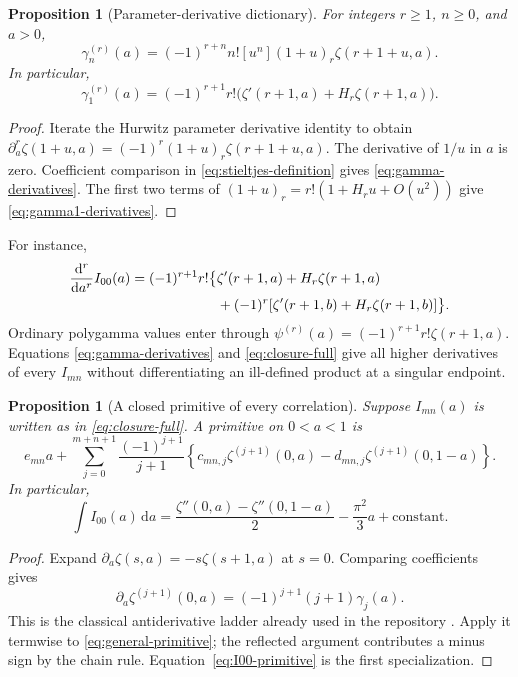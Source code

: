 \documentclass[11pt]{article}
\numberwithin{equation}{section}
\newtheorem{proposition}[theorem]{Proposition}
\theoremstyle{definition}
\theoremstyle{remark}
\newcommand{\dd}{\,\mathrm d}
\newcommand{\coeff}[1]{\left[#1\right]}
\begin{document}
\begin{proposition}[Parameter-derivative dictionary]
\label{prop:derivative}
For integers $r\ge1$, $n\ge0$, and $a>0$,
\begin{equation}
 \gamma_n^{(r)}(a)=(-1)^{r+n}n!\coeff{u^n}
                  (1+u)_r\zeta(r+1+u,a).
 \label{eq:gamma-derivatives}
\end{equation}
In particular,
\begin{equation}
 \gamma_1^{(r)}(a)=(-1)^{r+1}r!
                   \bigl(\zeta'(r+1,a)+H_r\zeta(r+1,a)\bigr).
 \label{eq:gamma1-derivatives}
\end{equation}
\end{proposition}
\begin{proof}
Iterate the Hurwitz parameter derivative identity to obtain
$\partial_a^r\zeta(1+u,a)=(-1)^r(1+u)_r\zeta(r+1+u,a)$.
The derivative of $1/u$ in $a$ is zero. Coefficient comparison in
\eqref{eq:stieltjes-definition} gives \eqref{eq:gamma-derivatives}.
The first two terms of $(1+u)_r=r!(1+H_ru+O(u^2))$ give
\eqref{eq:gamma1-derivatives}.
\end{proof}

For instance,
\begin{align}
 \frac{\mathrm d^r}{\mathrm da^r}I_{00}(a)
 =(-1)^{r+1}r!\bigl\{&\zeta'(r+1,a)+H_r\zeta(r+1,a)\notag\\
 &+(-1)^r[\zeta'(r+1,b)+H_r\zeta(r+1,b)]\bigr\}.
 \label{eq:I00-derivatives}
\end{align}
Ordinary polygamma values enter through
$\psi^{(r)}(a)=(-1)^{r+1}r!\zeta(r+1,a)$.
Equations \eqref{eq:gamma-derivatives} and \eqref{eq:closure-full} give
all higher derivatives of every $I_{mn}$ without differentiating an
ill-defined product at a singular endpoint.

\begin{proposition}[A closed primitive of every correlation]
\label{prop:primitive}
Suppose $I_{mn}(a)$ is written as in \eqref{eq:closure-full}.
A primitive on $0<a<1$ is
\begin{equation}
 e_{mn}a+\sum_{j=0}^{m+n+1}\frac{(-1)^{j+1}}{j+1}
 \left\{c_{mn,j}\zeta^{(j+1)}(0,a)
              -d_{mn,j}\zeta^{(j+1)}(0,1-a)\right\}.
 \label{eq:general-primitive}
\end{equation}
In particular,
\begin{equation}
 \int I_{00}(a)\dd a
 =\frac{\zeta''(0,a)-\zeta''(0,1-a)}2
                  -\frac{\pi^2}{3}a+\text{constant}.
 \label{eq:I00-primitive}
\end{equation}
\end{proposition}
\begin{proof}
Expand $\partial_a\zeta(s,a)=-s\zeta(s+1,a)$ at $s=0$.
Comparing coefficients gives
\[
 \partial_a\zeta^{(j+1)}(0,a)=(-1)^{j+1}(j+1)\gamma_j(a).
\]
This is the classical antiderivative ladder already used in the
repository \cite{repo-integration}. Apply it termwise to
\eqref{eq:general-primitive}; the reflected argument contributes a minus
sign by the chain rule. Equation~\eqref{eq:I00-primitive} is the first
specialization.
\end{proof}
\end{document}
